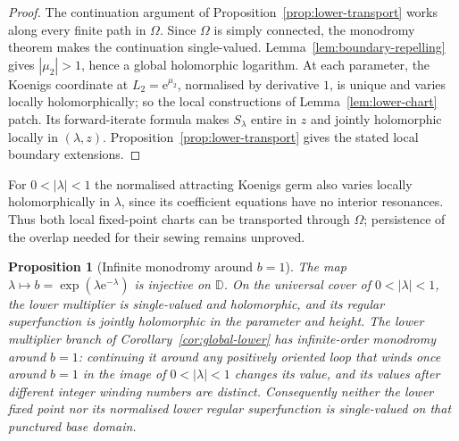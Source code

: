 \documentclass[11pt]{amsart}
\newtheorem{proposition}[theorem]{Proposition}
\theoremstyle{definition}
\newcommand{\eee}{\mathrm{e}}
\begin{document}
\begin{proof}
The continuation argument of Proposition~\ref{prop:lower-transport}
works along every finite path in $\Omega$.  Since $\Omega$ is simply
connected, the monodromy theorem makes the continuation single-valued.
Lemma~\ref{lem:boundary-repelling} gives $|\mu_2|>1$, hence a global
holomorphic logarithm.  At each parameter, the Koenigs coordinate at
$L_2=\eee^{\mu_2}$, normalised by derivative $1$, is unique and varies
locally holomorphically; so the local constructions of
Lemma~\ref{lem:lower-chart} patch.  Its forward-iterate formula makes
$S_\lambda$ entire in $z$ and jointly holomorphic locally in
$(\lambda,z)$.  Proposition~\ref{prop:lower-transport} gives the stated
local boundary extensions.
\end{proof}

For $0<|\lambda|<1$ the normalised attracting Koenigs germ also varies
locally holomorphically in $\lambda$, since its coefficient equations
have no interior resonances.  Thus both local fixed-point charts can be
transported through $\Omega$; persistence of the overlap needed for
their sewing remains unproved.

\enlargethispage{1\baselineskip}
\begin{proposition}[Infinite monodromy around $b=1$]
\label{prop:lower-monodromy}
The map $\lambda\mapsto b=\exp(\lambda\eee^{-\lambda})$ is injective on
$\mathbb D$.  On the universal cover of $0<|\lambda|<1$, the lower
multiplier is single-valued and holomorphic, and its regular
superfunction is jointly holomorphic in the parameter and height.
The lower multiplier branch of
Corollary~\ref{cor:global-lower} has infinite-order monodromy around
$b=1$: continuing it around any positively oriented loop that winds
once around $b=1$ in the image of $0<|\lambda|<1$ changes its value,
and its values after different integer winding numbers are distinct.
Consequently neither the lower fixed point nor its normalised lower
regular superfunction is single-valued on that punctured base domain.
\end{proposition}
\end{document}
